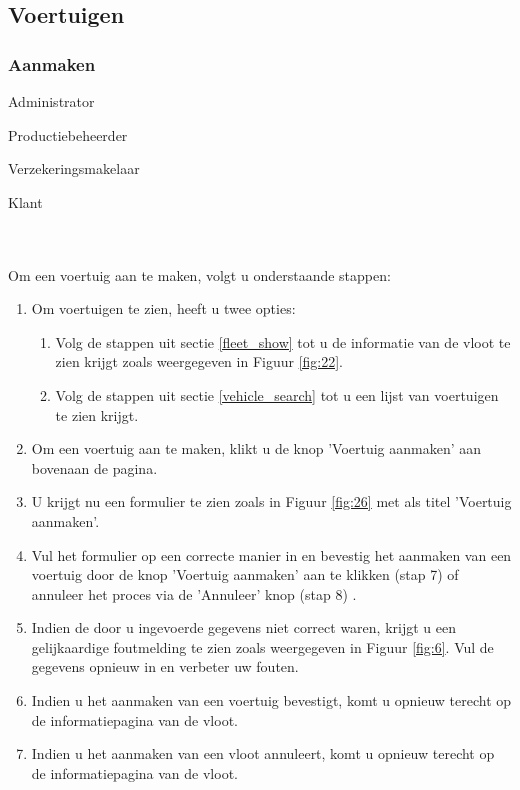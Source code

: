 \documentclass[11pt,openany]{article}
\newcommand{\cmark}{\ding{51}}%
\newcommand{\xmark}{\ding{55}}%
\newcommand{\done}{\rlap{$\square$}{\raisebox{2pt}{\large\hspace{1pt}\cmark}}%
	\hspace{-2.5pt}}
\newcommand{\wontfix}{\rlap{$\square$}{\large\hspace{1pt}\xmark}}
\begin{document}
\subsection{Voertuigen}
\label{vehicles}
\subsubsection{Aanmaken}
\begin{todolist}
	\item[\done] Administrator
	\item[\done] Productiebeheerder
	\item[\done] Verzekeringsmakelaar
	\item[\wontfix] Klant 
\end{todolist}
\\
\\
Om een voertuig aan te maken, volgt u onderstaande stappen:
\begin{enumerate}
	\item Om voertuigen te zien, heeft u twee opties:
	\begin{enumerate}
		\item Volg de stappen uit sectie \ref{fleet_show} tot u de informatie van de vloot te zien krijgt zoals weergegeven in Figuur \ref{fig:22}.
		\item Volg de stappen uit sectie \ref{vehicle_search} tot u een lijst van voertuigen te zien krijgt.
	\end{enumerate}
	
	\item Om een voertuig aan te maken, klikt u de knop 'Voertuig aanmaken' aan bovenaan de pagina.
	\item U krijgt nu een formulier te zien zoals in Figuur \ref{fig:26} met als titel 'Voertuig aanmaken'.
	\item Vul het formulier op een correcte manier in en bevestig het aanmaken van een voertuig door de knop 'Voertuig aanmaken' aan te klikken (stap 7) of annuleer het proces via de 'Annuleer' knop (stap 8) .
	\item Indien de door u ingevoerde gegevens niet correct waren, krijgt u een gelijkaardige foutmelding te zien zoals weergegeven in Figuur \ref{fig:6}. Vul de gegevens opnieuw in en verbeter uw fouten.
	\item Indien u het aanmaken van een voertuig bevestigt, komt u opnieuw terecht op de informatiepagina van de vloot. 
	
	\item Indien u het aanmaken van een vloot annuleert, komt u opnieuw terecht op de informatiepagina van de vloot. 
\end{enumerate}
\end{document}
